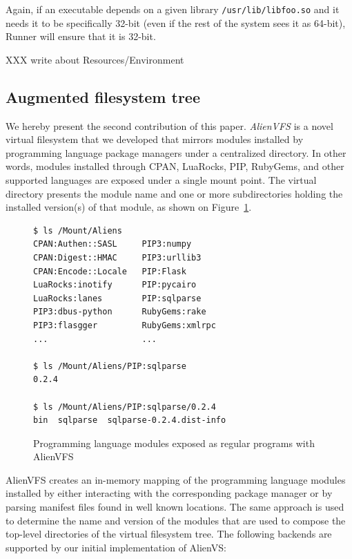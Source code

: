 \documentclass[sigplan, anonymous, 10pt]{acmart}
\begin{document}
Again, if an executable depends on a given library \texttt{/usr/\-lib/lib\-foo.so} and it
needs it to be specifically 32-bit (even if the rest of the system sees it
as 64-bit), Runner will ensure that it is 32-bit.

XXX write about Resources/Environment
\lipsum[8]

\subsection{Augmented filesystem tree}
We hereby present the second contribution of this paper. \textit{AlienVFS} is a novel virtual
filesystem that we developed that mirrors modules installed by programming language
package managers under a centralized directory. In other words, modules installed
through CPAN, LuaRocks, PIP, RubyGems, and other supported languages are exposed under
a single mount point. The virtual directory presents the module name and one or more
subdirectories holding the installed version(s) of that module, as shown on
Figure~\ref{fig:alienvfs}.

\begin{figure}
    \begin{Verbatim}[frame=single]
$ ls /Mount/Aliens
CPAN:Authen::SASL     PIP3:numpy
CPAN:Digest::HMAC     PIP3:urllib3
CPAN:Encode::Locale   PIP:Flask
LuaRocks:inotify      PIP:pycairo
LuaRocks:lanes        PIP:sqlparse
PIP3:dbus-python      RubyGems:rake
PIP3:flasgger         RubyGems:xmlrpc
...                   ...

$ ls /Mount/Aliens/PIP:sqlparse
0.2.4

$ ls /Mount/Aliens/PIP:sqlparse/0.2.4
bin  sqlparse  sqlparse-0.2.4.dist-info
    \end{Verbatim}
    \caption{Programming language modules exposed as regular programs with AlienVFS}
    \label{fig:alienvfs}
\end{figure}

AlienVFS creates an in-memory mapping of the programming language modules installed
by either interacting with the corresponding package manager or by parsing manifest
files found in well known locations. The same approach is used to determine the
name and version of the modules that are used to compose the top-level directories
of the virtual filesystem tree. The following backends are supported by our initial
implementation of AlienVS:
\end{document}
